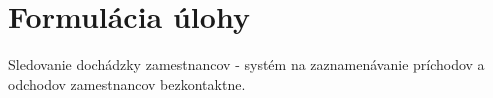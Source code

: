 \section{Formulácia úlohy}
Sledovanie 
dochádzky 
zamestnancov - systém na zaznamenávanie príchodov a odchodov zamestnancov bezkontaktne.